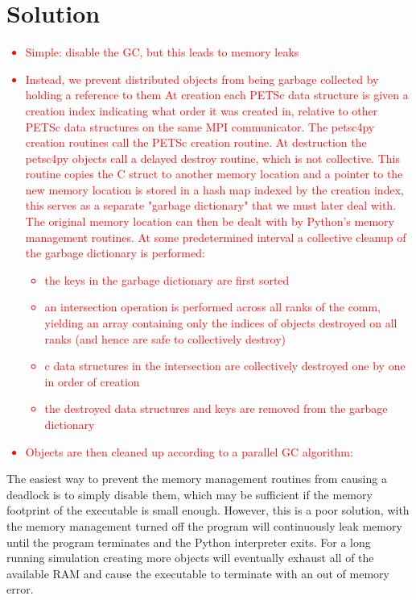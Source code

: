 \documentclass[10pt,journal,compsoc]{IEEEtran}
\newcommand{\jacknotes}[1]{\textcolor{red}{#1}}
\begin{document}
\section{Solution}
\label{sec:solution}

\jacknotes{
\begin{itemize}
	\item Simple: disable the GC, but this leads to memory leaks
	\item Instead, we prevent distributed objects from being garbage collected by holding a reference to them
	At creation each PETSc data structure is given a creation index indicating what order it was created in, relative to other PETSc data structures on the same MPI communicator. The petsc4py creation routines call the PETSc creation routine.
	At destruction the petsc4py objects call a delayed destroy routine, which is not collective.
	This routine copies the C struct to another memory location and a pointer to the new memory location is stored in a hash map indexed by the creation index, this serves as a separate "garbage dictionary" that we must later deal with.
	The original memory location can then be dealt with by Python's memory management routines.
	At some predetermined interval a collective cleanup of the garbage dictionary is performed:
	\begin{itemize}
	\item the keys in the garbage dictionary are first sorted
	\item an intersection operation is performed across all ranks of the comm, yielding an array containing only the indices of objects destroyed on all ranks (and hence are safe to collectively destroy)
	\item c data structures in the intersection are collectively destroyed one by one in order of creation
	\item the destroyed data structures and keys are removed from the garbage dictionary
\end{itemize}
	\item Objects are then cleaned up according to a parallel GC algorithm:
\end{itemize}
}

The easiest way to prevent the memory management routines from causing a deadlock is to simply disable them, which may be sufficient if the memory footprint of the executable is small enough.
However, this is a poor solution, with the memory management turned off the program will continuously leak memory until the program terminates and the Python interpreter exits.
For a long running simulation creating more objects will eventually exhaust all of the available RAM and cause the executable to terminate with an out of memory error.
\end{document}
